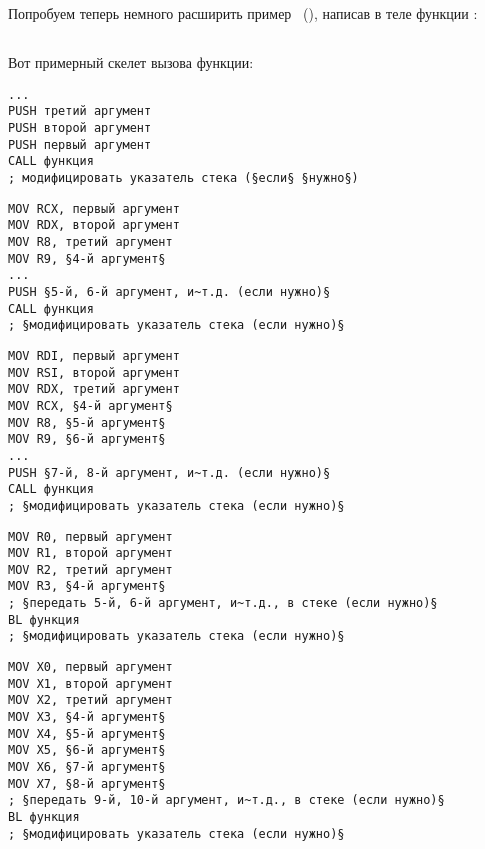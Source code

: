 \section{\PrintfSeveralArgumentsSectionName}

Попробуем теперь немного расширить пример \IT{\HelloWorldSectionName}~(),
написав в теле функции \main:







\subsection{\Conclusion{}}

Вот примерный скелет вызова функции:

\begin{lstlisting}[caption=x86,style=customasmx86]
...
PUSH третий аргумент
PUSH второй аргумент
PUSH первый аргумент
CALL функция
; модифицировать указатель стека (§если§ §нужно§)
\end{lstlisting}

\begin{lstlisting}[caption=x64 (MSVC),style=customasmx86]
MOV RCX, первый аргумент
MOV RDX, второй аргумент
MOV R8, третий аргумент
MOV R9, §4-й аргумент§
...
PUSH §5-й, 6-й аргумент, и~т.д. (если нужно)§
CALL функция
; §модифицировать указатель стека (если нужно)§
\end{lstlisting}

\begin{lstlisting}[caption=x64 (GCC),style=customasmx86]
MOV RDI, первый аргумент
MOV RSI, второй аргумент
MOV RDX, третий аргумент
MOV RCX, §4-й аргумент§
MOV R8, §5-й аргумент§
MOV R9, §6-й аргумент§
...
PUSH §7-й, 8-й аргумент, и~т.д. (если нужно)§
CALL функция
; §модифицировать указатель стека (если нужно)§
\end{lstlisting}

\begin{lstlisting}[caption=ARM,style=customasmARM]
MOV R0, первый аргумент
MOV R1, второй аргумент
MOV R2, третий аргумент
MOV R3, §4-й аргумент§
; §передать 5-й, 6-й аргумент, и~т.д., в стеке (если нужно)§
BL функция
; §модифицировать указатель стека (если нужно)§
\end{lstlisting}

\begin{lstlisting}[caption=ARM64,style=customasmARM]
MOV X0, первый аргумент
MOV X1, второй аргумент
MOV X2, третий аргумент
MOV X3, §4-й аргумент§
MOV X4, §5-й аргумент§
MOV X5, §6-й аргумент§
MOV X6, §7-й аргумент§
MOV X7, §8-й аргумент§
; §передать 9-й, 10-й аргумент, и~т.д., в стеке (если нужно)§
BL функция
; §модифицировать указатель стека (если нужно)§
\end{lstlisting}

